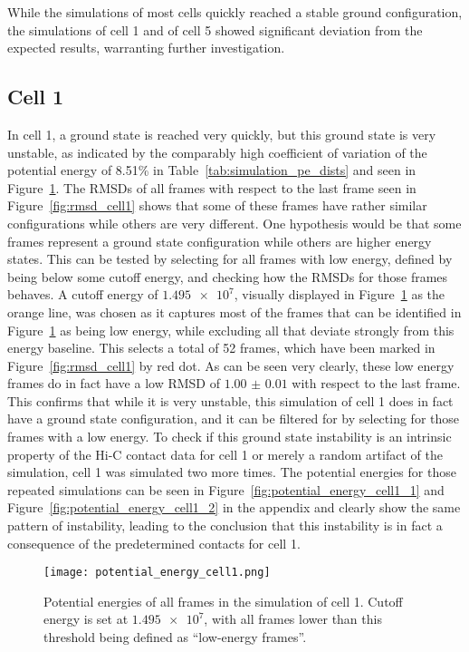 While the simulations of most cells quickly reached a stable ground configuration, the simulations of cell 1 and of cell 5 showed significant deviation from the expected results, warranting further investigation.

\subsection{Cell 1} %
\label{sub:cell_1}

In cell 1, a ground state is reached very quickly, but this ground state is very unstable, as indicated by the comparably high coefficient of variation of the potential energy of 8.51\% in Table~\ref{tab:simulation_pe_dists} and seen in Figure~\ref{fig:potential_energy_cell1}. The RMSDs of all frames with respect to the last frame seen in Figure~\ref{fig:rmsd_cell1} shows that some of these frames have rather similar configurations while others are very different. One hypothesis would be that some frames represent a ground state configuration while others are higher energy states. This can be tested by selecting for all frames with low energy, defined by being below some cutoff energy, and checking how the RMSDs for those frames behaves. A cutoff energy of \(\num{1.495e7}\), visually displayed in Figure~\ref{fig:potential_energy_cell1} as the orange line, was chosen as it captures most of the frames that can be identified in Figure~\ref{fig:potential_energy_cell1} as being low energy, while excluding all that deviate strongly from this energy baseline. This selects a total of 52 frames, which have been marked in Figure~\ref{fig:rmsd_cell1} by red dot. As can be seen very clearly, these low energy frames do in fact have a low RMSD of \(\num{1.00(1)}\) with respect to the last frame. This confirms that while it is very unstable, this simulation of cell 1 does in fact have a ground state configuration, and it can be filtered for by selecting for those frames with a low energy. To check if this ground state instability is an intrinsic property of the Hi-C contact data for cell 1 or merely a random artifact of the simulation, cell 1 was simulated two more times. The potential energies for those repeated simulations can be seen in Figure~\ref{fig:potential_energy_cell1_1} and Figure~\ref{fig:potential_energy_cell1_2} in the appendix and clearly show the same pattern of instability, leading to the conclusion that this instability is in fact a consequence of the predetermined contacts for cell 1.

\begin{figure}[ht]
\centering
  \texttt{[image: potential\_energy\_cell1.png]}
  \caption{Potential energies of all frames in the simulation of cell 1. Cutoff energy is set at \(\num{1.495e7}\), with all frames lower than this threshold being defined as \enquote{low-energy frames}.}
  \label{fig:potential_energy_cell1}
\end{figure}

